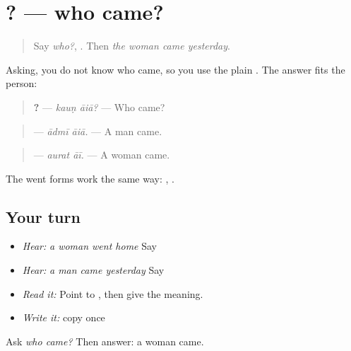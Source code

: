 \section[\texorpdfstring{\pa{ਕੌਣ} \pa{ਆਇਆ}? (kauṇ āiā?)}{ਕੌਣ ਆਇਆ? (kauṇ āiā?)}]{ ? — who came?}

\label{lesson:PA-C217-who-came}



\begin{quote}
Say \emph{who?}, \textbf{}. Then \emph{the woman came yesterday}.
\end{quote}

\begin{grammarlens}[title={Grammar Lens: the one who came decides}]
Asking, you do not know who came, so you use the plain \textbf{}. The answer fits the person:

\begin{quote}
\textbf{ ?} — \emph{kauṇ āiā?} — Who came?
\end{quote}

\begin{quote}
\textbf{ } — \emph{ādmī āiā.} — A man came.
\end{quote}

\begin{quote}
\textbf{ } — \emph{aurat āī.} — A woman came.
\end{quote}

The went forms work the same way: \textbf{ }, \textbf{ }.
\end{grammarlens}

\subsection*{Your turn}
\begin{itemize}
\raggedright
  \item \emph{Hear:} \emph{a woman went home} Say \textbf{  }
  \item \emph{Hear:} \emph{a man came yesterday} Say \textbf{  }
  \item \emph{Read it:} \textbf{ } Point to \textbf{}, then give the meaning.
  \item \emph{Write it:} copy \textbf{ } once
\end{itemize}

\begin{tcolorbox}[breakable,colback=teal!4,colframe=teal!35!black,title={Before you move on}]
Ask \emph{who came?} Then answer: a woman came.
\end{tcolorbox}
